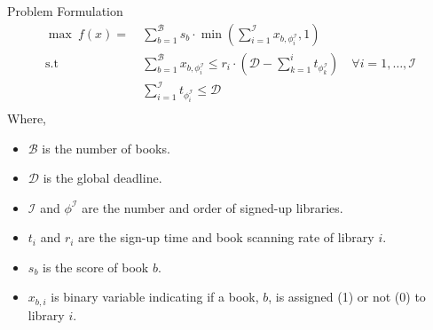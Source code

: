 \begin{frame}{Problem Formulation}
  \begin{equation*}
    \begin{aligned}
      \max\ f(x) =\  & \sum_{b = 1}^{\mathcal{B}}{s_{b} \cdot \min\left(\sum_{i = 1}^{\mathcal{I}}{x_{b, \phi_{i}^\mathcal{I}}} , 1\right)}                                                                     \\
      \text{s.t }    & \sum_{b = 1}^{\mathcal{B}}{x_{b, \phi_{i}^\mathcal{I}}} \leq r_{i} \cdot \left(\mathcal{D} - \sum_{k = 1}^{i}{t_{\phi_{k}^\mathcal{I}}} \right) \quad \forall i = 1, \ldots, \mathcal{I} \\
                     & \sum_{i = 1}^{\mathcal{I}}{t_{\phi_{i}^\mathcal{I}}} \leq \mathcal{D}                                                                                                                    \\
    \end{aligned}
  \end{equation*}
  Where,
  \begin{itemize}
    \item $\mathcal{B}$ is the number of books.
    \item $\mathcal{D}$ is the global deadline.
    \item $\mathcal{I}$ and $\phi^\mathcal{I}$ are the number and order of signed-up libraries.
    \item $t_{i}$ and $r_{i}$ are the sign-up time and book scanning rate of library $i$.
    \item $s_{b}$ is the score of book $b$.
    \item $x_{b,i}$ is binary variable indicating if a book, $b$, is assigned (1) or not (0) to library $i$.
  \end{itemize}
\end{frame}


